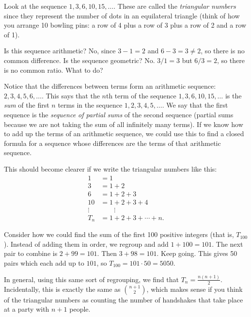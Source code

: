 \documentclass[10pt,]{book}
\theoremstyle{plain}
\theoremstyle{definition}
\theoremstyle{definition}
\theoremstyle{definition}
\numberwithin{equation}{chapter}
\newcommand{\amp}{ & }
\begin{document}
        Look at the sequence \(1, 3, 6, 10, 15,\ldots\). These are called the \emph{triangular numbers} since they represent the number of dots in an equilateral triangle (think of how you arrange 10 bowling pins: a row of 4 plus a row of 3 plus a row of 2 and a row of 1).
\par

        Is this sequence arithmetic? No, since \(3-1 = 2\) and \(6-3 = 3 \ne 2\), so there is no common difference. Is the sequence geometric? No. \(3/1 = 3\) but \(6/3 = 2\), so there is no common ratio. What to do?
\par

        Notice that the differences between terms form an arithmetic sequence: \(2, 3, 4, 5, 6,\ldots\). This says that the \(n\)th term of the sequence \(1,3,6,10,15,\ldots\) is the \emph{sum} of the first \(n\) terms in the sequence \(1,2,3,4,5,\ldots\). We say that the first sequence is the \emph{sequence of partial sums} of the second sequence (partial sums because we are not taking the sum of all infinitely many terms). If we know how to add up the terms of an arithmetic sequence, we could use this to find a closed formula for a sequence whose differences are the terms of that arithmetic sequence.
\par

        This should become clearer if we write the triangular numbers like this:
        \begin{align*}
 1 \amp = 1\\
 3 \amp = 1+2\\
 6 \amp = 1 + 2 + 3\\
 10 \amp = 1+2 + 3+ 4\\
 \vdots \amp \qquad \vdots\\
 T_n \amp = 1 + 2 + 3 + \cdots + n.
\end{align*}
\par

        Consider how we could find the sum of the first 100 positive integers (that is, \(T_{100}\)). Instead of adding them in order, we regroup and add \(1+100 = 101\). The next pair to combine is \(2+99 = 101\). Then \(3+98 = 101\). Keep going. This gives 50 pairs which each add up to \(101\), so \(T_{100} = 101\cdot 50 = 5050\).
\par

        In general, using this same sort of regrouping, we find that \(T_n = \frac{n(n+1)}{2}\). Incidentally, this is exactly the same as \({n+1 \choose 2}\), which makes sense if you think of the triangular numbers as counting the number of handshakes that take place at a party with \(n+1\) people.
\par
\end{document}
